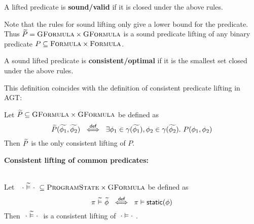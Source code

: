 \begin{definition}
    A lifted predicate is \textbf{sound/valid} if it is closed under the above rules.
\end{definition}

Note that the rules for sound lifting only give a lower bound for the predicate.
Thus $\widetilde{P} = \textsc{GFormula} \times \textsc{GFormula}$ is a sound predicate lifting of any binary predicate $P \subseteq \textsc{Formula} \times \textsc{Formula}$.

\begin{definition}
    A sound lifted predicate is \textbf{consistent/optimal} if it is the smallest set closed under the above rules.
\end{definition}

This definition coincides with the definition of consistent predicate lifting in AGT:

\begin{lemma}\label{lemma:consistent-pred-lifting-direct}
    Let $\widetilde{P} \subseteq \textsc{GFormula} \times \textsc{GFormula}$ be defined as
    \begin{displaymath} 
    \widetilde{P}(\widetilde{\phi_1}, \widetilde{\phi_2}) ~\overset{\textsf{def}}{\iff}~ \exists \phi_1 \in \gamma(\widetilde{\phi_1}), \phi_2 \in \gamma(\widetilde{\phi_2}).~ P(\phi_1, \phi_2)
    \end{displaymath}
    Then $\widetilde{P}$ is the only consistent lifting of $P$.
\end{lemma} %



\textbf{Consistent lifting of common predicates:}

\begin{lemma}~\\
    Let $~~\cdot \,\,\widetilde{\vDash}\,\, \cdot~ \subseteq \textsc{ProgramState} \times \textsc{GFormula}$ be defined as
    \begin{displaymath} 
    \pi \,\,\widetilde{\vDash}\,\, \widetilde{\phi} ~\overset{\textsf{def}}{\iff}~ \pi \vDash \textsf{static}(\phi)
    \end{displaymath}
    Then $~\cdot \,\,\widetilde{\vDash}\,\, \cdot~$ is a consistent lifting of $~\cdot \vDash \cdot~$.
\end{lemma}


